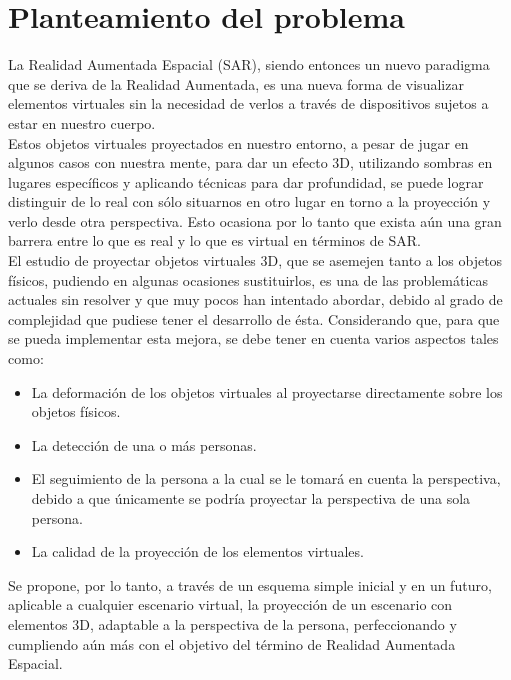 \documentclass[a4paper,openright,12pt]{report}
\begin{document}
\section{Planteamiento del problema}
La Realidad Aumentada Espacial (SAR), siendo entonces un nuevo paradigma que se deriva de la Realidad Aumentada, es una nueva forma de visualizar elementos virtuales sin la necesidad de verlos a través de dispositivos sujetos a estar en nuestro cuerpo.\\
Estos objetos virtuales proyectados en nuestro entorno, a pesar de jugar en algunos casos con nuestra mente, para dar un efecto 3D, utilizando sombras en lugares específicos y aplicando técnicas para dar profundidad, se puede lograr distinguir de lo real con sólo situarnos en otro lugar en torno a la proyección y verlo desde otra perspectiva. Esto ocasiona por lo tanto que exista aún una gran barrera entre lo que es real y lo que es virtual en términos de SAR.\\
El estudio de proyectar objetos virtuales 3D, que se asemejen tanto a los objetos físicos, pudiendo en algunas ocasiones sustituirlos, es una de las problemáticas actuales sin resolver y que muy pocos han intentado abordar, debido al grado de complejidad que pudiese tener el desarrollo de ésta. Considerando que, para que se pueda implementar esta mejora, se debe tener en cuenta varios aspectos tales como:
\begin{itemize}
\item La deformación de los objetos virtuales al proyectarse directamente sobre los objetos físicos.
\item La detección de una o más personas.
\item El seguimiento de la persona a la cual se le tomará en cuenta la perspectiva, debido a que únicamente se podría proyectar la perspectiva de una sola persona.
\item La calidad de la proyección de los elementos virtuales.
\end{itemize}
Se propone, por lo tanto, a través de un esquema simple inicial y en un futuro, aplicable a cualquier escenario virtual, la proyección de un escenario con elementos 3D, adaptable a la perspectiva de la persona, perfeccionando y cumpliendo aún más con el objetivo del término de Realidad Aumentada Espacial.

\end{document}
